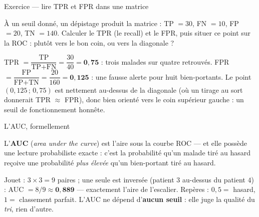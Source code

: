 \documentclass[aspectratio=169,11pt]{beamer}
\begin{document}
\begin{frame}{Exercice — lire TPR et FPR dans une matrice}
\begin{ucadrec}[Énoncé]
{\small À un seuil donné, un dépistage produit la matrice : TP $= 30$, FN $= 10$, FP $= 20$, TN $= 140$. Calculer le TPR (le recall) et le FPR, puis situer ce point sur la ROC : plutôt vers le bon coin, ou vers la diagonale ?}
\end{ucadrec}
\pause
\begin{ucadex}[Correction]
{\small TPR $= \dfrac{\text{TP}}{\text{TP}+\text{FN}} = \dfrac{30}{40} = \mathbf{0{,}75}$ : trois malades sur quatre retrouvés. FPR $= \dfrac{\text{FP}}{\text{FP}+\text{TN}} = \dfrac{20}{160} = \mathbf{0{,}125}$ : une fausse alerte pour huit bien-portants. Le point $(0{,}125\,;\,0{,}75)$ est nettement au-dessus de la diagonale (où un tirage au sort donnerait TPR $\approx$ FPR), donc bien orienté vers le coin supérieur gauche : un seuil de fonctionnement honnête.}
\end{ucadex}
\end{frame}

\begin{frame}{L'AUC, formellement}
\begin{ucaddef}[Définition]
{\small L'\textbf{AUC} (\emph{area under the curve}) est l'aire sous la courbe ROC — et elle possède une lecture probabiliste exacte : c'est la probabilité qu'un malade tiré au hasard reçoive une probabilité \emph{plus élevée} qu'un bien-portant tiré au hasard.}
\end{ucaddef}
{\small Jouet : $3 \times 3 = 9$ paires ; une seule est inversée (patient $3$ au-dessus du patient $4$) : AUC $= 8/9 \approx \mathbf{0{,}889}$ — exactement l'aire de l'escalier. Repères : $0{,}5 =$ hasard, $1 =$ classement parfait. L'AUC ne dépend d'\textbf{aucun seuil} : elle juge la qualité du \emph{tri}, rien d'autre.}
\end{frame}
\end{document}
